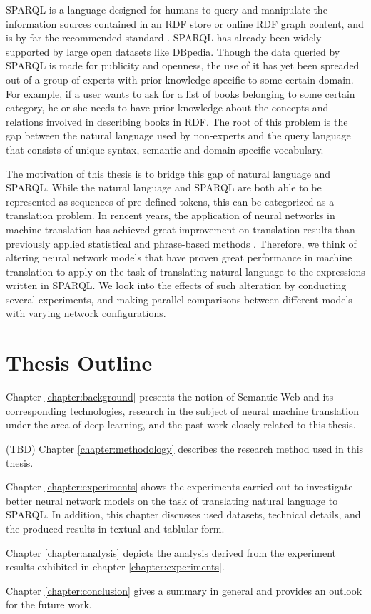 SPARQL is a language designed for humans to query and manipulate the information sources contained in an RDF store or online RDF graph content, and is by far the recommended standard \cite{Harris2013}. SPARQL has already been widely supported by large open datasets like DBpedia. Though the data queried by SPARQL is made for publicity and openness, the use of it has yet been spreaded out of a group of experts with prior knowledge specific to some certain domain. For example, if a user wants to ask for a list of books belonging to some certain category, he or she needs to have prior knowledge about the concepts and relations involved in describing books in RDF. The root of this problem is the gap between the natural language used by non-experts and the query language that consists of unique syntax, semantic and domain-specific vocabulary. 

The motivation of this thesis is to bridge this gap of natural language and SPARQL. While the natural language and SPARQL are both able to be represented as sequences of pre-defined tokens, this can be categorized as a translation problem. In rencent years, the application of neural networks in machine translation has achieved great improvement on translation results than previously applied statistical and phrase-based methods \cite{Moussallem2017}. Therefore, we think of altering neural network models that have proven great performance in machine translation to apply on the task of translating natural language to the expressions written in SPARQL. We look into the effects of such alteration by conducting several experiments, and making parallel comparisons between different models with varying network configurations. 

\section{Thesis Outline} \label{section:thesis outline}

Chapter \ref{chapter:background} presents the notion of Semantic Web and its corresponding technologies, research in the subject of neural machine translation under the area of deep learning, and the past work closely related to this thesis. 

(TBD) Chapter \ref{chapter:methodology} describes the research method used in this thesis.

Chapter \ref{chapter:experiments} shows the experiments carried out to investigate better neural network models on the task of translating natural language to SPARQL. In addition, this chapter discusses used datasets, technical details, and the produced results in textual and tablular form.

Chapter \ref{chapter:analysis} depicts the analysis derived from the experiment results exhibited in chapter \ref{chapter:experiments}.

Chapter \ref{chapter:conclusion} gives a summary in general and provides an outlook for the future work.